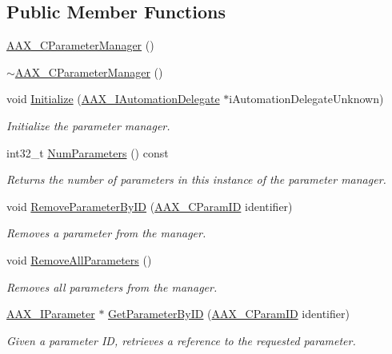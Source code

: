 \subsection*{Public Member Functions}
\begin{DoxyCompactItemize}
\item 
\mbox{\hyperlink{a01545_a2464652c52cc61b437339a5268ee4f66}{A\+A\+X\+\_\+\+C\+Parameter\+Manager}} ()
\item 
\mbox{\hyperlink{a01545_a86e327094928b44b1ca11ef145d4f301}{$\sim$\+A\+A\+X\+\_\+\+C\+Parameter\+Manager}} ()
\item 
void \mbox{\hyperlink{a01545_ab7921f8b312d65917e3b38c5edfb57d8}{Initialize}} (\mbox{\hyperlink{a01773}{A\+A\+X\+\_\+\+I\+Automation\+Delegate}} $\ast$i\+Automation\+Delegate\+Unknown)
\begin{DoxyCompactList}\small\item\em Initialize the parameter manager. \end{DoxyCompactList}\item 
int32\+\_\+t \mbox{\hyperlink{a01545_a78b8c6b1545b42123c2b6ff4dad9b386}{Num\+Parameters}} () const
\begin{DoxyCompactList}\small\item\em Returns the number of parameters in this instance of the parameter manager. \end{DoxyCompactList}\item 
void \mbox{\hyperlink{a01545_a1c37068e235b493a6aa2a57fa26379ba}{Remove\+Parameter\+By\+ID}} (\mbox{\hyperlink{a00392_a1440c756fe5cb158b78193b2fc1780d1}{A\+A\+X\+\_\+\+C\+Param\+ID}} identifier)
\begin{DoxyCompactList}\small\item\em Removes a parameter from the manager. \end{DoxyCompactList}\item 
void \mbox{\hyperlink{a01545_a6bbfed26d6dda840c89df90b66c196ac}{Remove\+All\+Parameters}} ()
\begin{DoxyCompactList}\small\item\em Removes all parameters from the manager. \end{DoxyCompactList}\item 
\mbox{\hyperlink{a01857}{A\+A\+X\+\_\+\+I\+Parameter}} $\ast$ \mbox{\hyperlink{a01545_a405918dfca50993f8c0b5259b3c5ee95}{Get\+Parameter\+By\+ID}} (\mbox{\hyperlink{a00392_a1440c756fe5cb158b78193b2fc1780d1}{A\+A\+X\+\_\+\+C\+Param\+ID}} identifier)
\begin{DoxyCompactList}\small\item\em Given a parameter ID, retrieves a reference to the requested parameter. \end{DoxyCompactList}\item 

\end{DoxyCompactItemize}
